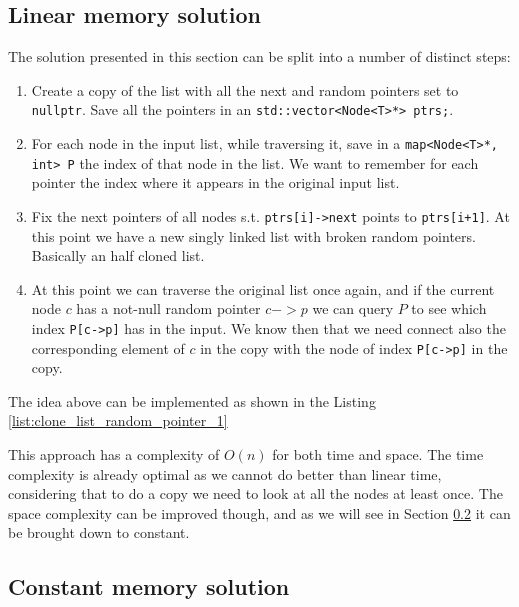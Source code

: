 \subsection{Linear memory solution}
\label{clone_list_random_pointer:sec:bruteforce}
The solution presented in this section can be split into a number of distinct steps:
\begin{enumerate}
	\item Create a copy of the list with all the  next and random pointers set to \lstinline[columns=fixed]{nullptr}. Save all the pointers in an \lstinline[columns=fixed]{std::vector<Node<T>*> ptrs;}.
	\item For each node in the input list, while traversing it, save in a \lstinline[columns=fixed]{map<Node<T>*, int> P} the index of that node in the list. We want to remember for each pointer the index where it appears in the original input list. 
	\item Fix the next pointers of all nodes s.t. \lstinline[columns=fixed]{ptrs[i]->next} points to  \lstinline[columns=fixed]{ptrs[i+1]}. At this point we have a new singly linked list with broken random pointers. Basically an half cloned list.
	\item At this point we can traverse the original list once again, and if the current node $c$ has a not-null random pointer $c->p$ we can query $P$ to see which index \lstinline[columns=fixed]{P[c->p]} has in the input. We know then that we need connect also the corresponding element of $c$ in the copy with the node of index \lstinline[columns=fixed]{P[c->p]} in the copy.
\end{enumerate}

The idea above can be implemented as shown in the Listing \ref{list:clone_list_random_pointer_1}




This approach has a complexity of $O(n)$ for both time and space. The time complexity is already optimal as we cannot do better than linear time, considering that to do a copy we need to look at all the nodes at least once. The space complexity can be improved though, and as we will see in Section \ref{clone_list_random_pointer:sec:interleaved_lists} it can be brought down to constant.

\subsection{Constant memory solution}
\label{clone_list_random_pointer:sec:interleaved_lists}

